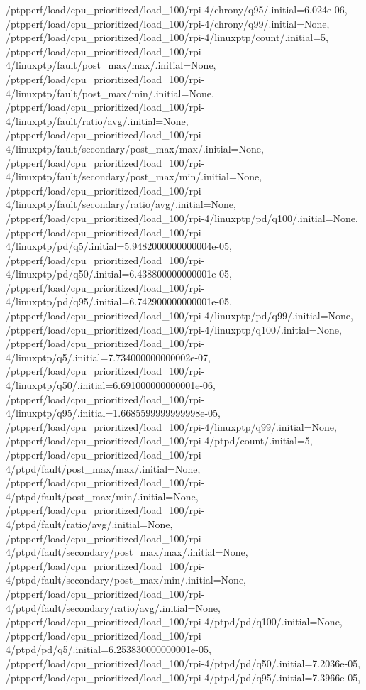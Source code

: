 {    /ptpperf/load/cpu_prioritized/load_100/rpi-4/chrony/q95/.initial=6.024e-06,
    /ptpperf/load/cpu_prioritized/load_100/rpi-4/chrony/q99/.initial=None,
    /ptpperf/load/cpu_prioritized/load_100/rpi-4/linuxptp/count/.initial=5,
    /ptpperf/load/cpu_prioritized/load_100/rpi-4/linuxptp/fault/post_max/max/.initial=None,
    /ptpperf/load/cpu_prioritized/load_100/rpi-4/linuxptp/fault/post_max/min/.initial=None,
    /ptpperf/load/cpu_prioritized/load_100/rpi-4/linuxptp/fault/ratio/avg/.initial=None,
    /ptpperf/load/cpu_prioritized/load_100/rpi-4/linuxptp/fault/secondary/post_max/max/.initial=None,
    /ptpperf/load/cpu_prioritized/load_100/rpi-4/linuxptp/fault/secondary/post_max/min/.initial=None,
    /ptpperf/load/cpu_prioritized/load_100/rpi-4/linuxptp/fault/secondary/ratio/avg/.initial=None,
    /ptpperf/load/cpu_prioritized/load_100/rpi-4/linuxptp/pd/q100/.initial=None,
    /ptpperf/load/cpu_prioritized/load_100/rpi-4/linuxptp/pd/q5/.initial=5.9482000000000004e-05,
    /ptpperf/load/cpu_prioritized/load_100/rpi-4/linuxptp/pd/q50/.initial=6.438800000000001e-05,
    /ptpperf/load/cpu_prioritized/load_100/rpi-4/linuxptp/pd/q95/.initial=6.742900000000001e-05,
    /ptpperf/load/cpu_prioritized/load_100/rpi-4/linuxptp/pd/q99/.initial=None,
    /ptpperf/load/cpu_prioritized/load_100/rpi-4/linuxptp/q100/.initial=None,
    /ptpperf/load/cpu_prioritized/load_100/rpi-4/linuxptp/q5/.initial=7.734000000000002e-07,
    /ptpperf/load/cpu_prioritized/load_100/rpi-4/linuxptp/q50/.initial=6.691000000000001e-06,
    /ptpperf/load/cpu_prioritized/load_100/rpi-4/linuxptp/q95/.initial=1.6685599999999998e-05,
    /ptpperf/load/cpu_prioritized/load_100/rpi-4/linuxptp/q99/.initial=None,
    /ptpperf/load/cpu_prioritized/load_100/rpi-4/ptpd/count/.initial=5,
    /ptpperf/load/cpu_prioritized/load_100/rpi-4/ptpd/fault/post_max/max/.initial=None,
    /ptpperf/load/cpu_prioritized/load_100/rpi-4/ptpd/fault/post_max/min/.initial=None,
    /ptpperf/load/cpu_prioritized/load_100/rpi-4/ptpd/fault/ratio/avg/.initial=None,
    /ptpperf/load/cpu_prioritized/load_100/rpi-4/ptpd/fault/secondary/post_max/max/.initial=None,
    /ptpperf/load/cpu_prioritized/load_100/rpi-4/ptpd/fault/secondary/post_max/min/.initial=None,
    /ptpperf/load/cpu_prioritized/load_100/rpi-4/ptpd/fault/secondary/ratio/avg/.initial=None,
    /ptpperf/load/cpu_prioritized/load_100/rpi-4/ptpd/pd/q100/.initial=None,
    /ptpperf/load/cpu_prioritized/load_100/rpi-4/ptpd/pd/q5/.initial=6.253830000000001e-05,
    /ptpperf/load/cpu_prioritized/load_100/rpi-4/ptpd/pd/q50/.initial=7.2036e-05,
    /ptpperf/load/cpu_prioritized/load_100/rpi-4/ptpd/pd/q95/.initial=7.3966e-05,
}
